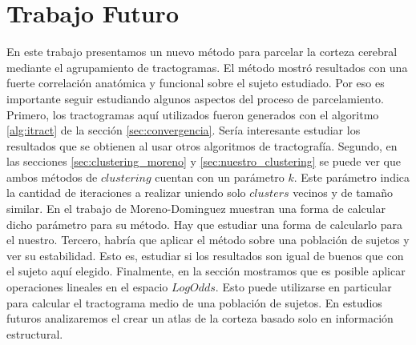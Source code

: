 \section{Trabajo Futuro}
En este trabajo presentamos un nuevo m\'etodo para parcelar la corteza
cerebral mediante el agrupamiento de tractogramas. El m\'etodo mostr\'o
resultados con una fuerte correlaci\'on anat\'omica y funcional sobre el
sujeto estudiado. Por eso es importante seguir estudiando algunos aspectos
del proceso de parcelamiento. Primero, los tractogramas aqu\'i utilizados
fueron generados con el algoritmo \ref{alg:itract} de la secci\'on 
\ref{sec:convergencia}. Ser\'ia interesante estudiar los resultados
que se obtienen al usar otros algoritmos de tractograf\'ia. Segundo, 
en las secciones \ref{sec:clustering_moreno} y \ref{sec:nuestro_clustering}
se puede ver que ambos m\'etodos de $clustering$
cuentan con un par\'ametro $k$. Este par\'ametro indica la cantidad de iteraciones a realizar uniendo solo $clusters$ vecinos y de tama\~no
similar. En el trabajo de Moreno-Dominguez \cite{Moreno-Dominguez2014} 
muestran una forma de calcular dicho par\'ametro para su m\'etodo. Hay
que estudiar una forma de calcularlo para el nuestro. Tercero, habr\'ia
que aplicar el m\'etodo sobre una poblaci\'on de sujetos y ver su
estabilidad. Esto es, estudiar si los resultados son igual de buenos que
con el sujeto aqu\'i elegido. Finalmente, en la secci\'on 
\label{sec:logit} mostramos que es posible aplicar operaciones
lineales en el espacio $LogOdds$. Esto puede utilizarse en particular para
calcular el tractograma medio de una poblaci\'on de sujetos. En estudios
futuros analizaremos el crear un atlas de la corteza basado solo en
informaci\'on estructural.\\

